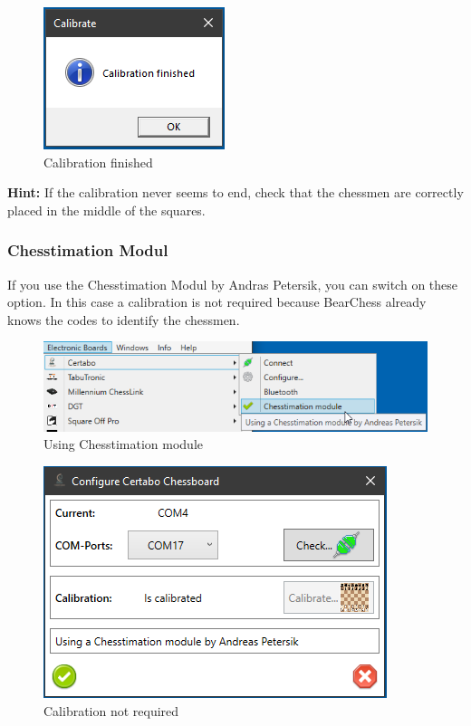 \documentclass[11pt,a4paper]{article}
\begin{document}
\begin{figure}[H]
	\centering
	\includegraphics[scale=1.0]{Calibrate4.png}
	\caption{Calibration finished }
	\label{fig:Calibrate4}
\end{figure}

\textbf{Hint:} If the calibration never seems to end, check that the chessmen are correctly placed in the middle of the squares.

\subsubsection{Chesstimation Modul}
If you use the Chesstimation Modul by Andras Petersik, you can switch on these option. In this case a calibration is not required because BearChess already knows the codes to identify the chessmen.

\begin{figure}[H]
	\centering
	\includegraphics[scale=0.8]{Certabo8.png}
	\caption{Using Chesstimation module}
	\label{fig:Certabo8}
\end{figure}

\begin{figure}[H]
	\centering
	\includegraphics[scale=1.0]{Certabo7.png}
	\caption{Calibration not required}
	\label{fig:Certabo7}
\end{figure}
\end{document}
